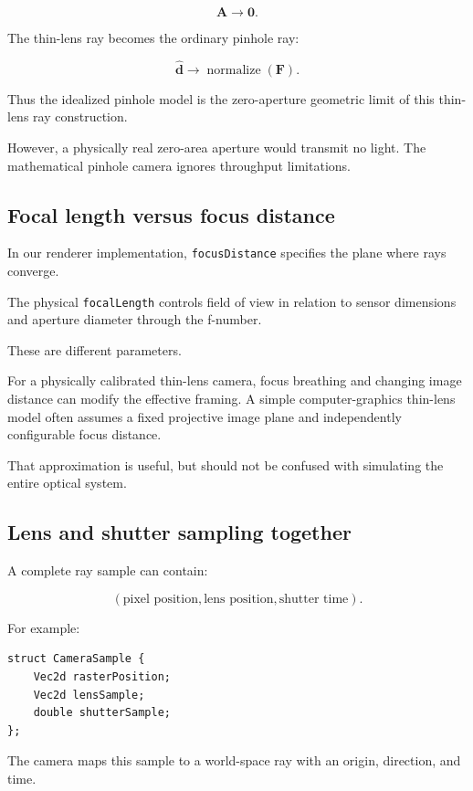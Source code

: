 \[ \mathbf A\to\mathbf0. \]

The thin-lens ray becomes the ordinary pinhole ray:

\[ \boxed{ \hat{\mathbf d} \to \operatorname{normalize}(\mathbf F). } \]

Thus the idealized pinhole model is the zero-aperture geometric limit of this thin-lens ray construction.

However, a physically real zero-area aperture would transmit no light. The mathematical pinhole camera ignores throughput limitations.

\subsection{Focal length versus focus distance}\label{02-foundations-ii-ch036-focal-length-versus-focus-distance}

In our renderer implementation, \texttt{focusDistance} specifies the plane where rays converge.

The physical \texttt{focalLength} controls field of view in relation to sensor dimensions and aperture diameter through the f-number.

These are different parameters.

For a physically calibrated thin-lens camera, focus breathing and changing image distance can modify the effective framing. A simple computer-graphics thin-lens model often assumes a fixed projective image plane and independently configurable focus distance.

That approximation is useful, but should not be confused with simulating the entire optical system.

\subsection{Lens and shutter sampling together}\label{02-foundations-ii-ch036-lens-and-shutter-sampling-together}

A complete ray sample can contain:

\[ \boxed{ (\text{pixel position}, \text{lens position}, \text{shutter time}) }. \]

For example:

\begin{verbatim}
struct CameraSample {
    Vec2d rasterPosition;
    Vec2d lensSample;
    double shutterSample;
};
\end{verbatim}

The camera maps this sample to a world-space ray with an origin, direction, and time.

